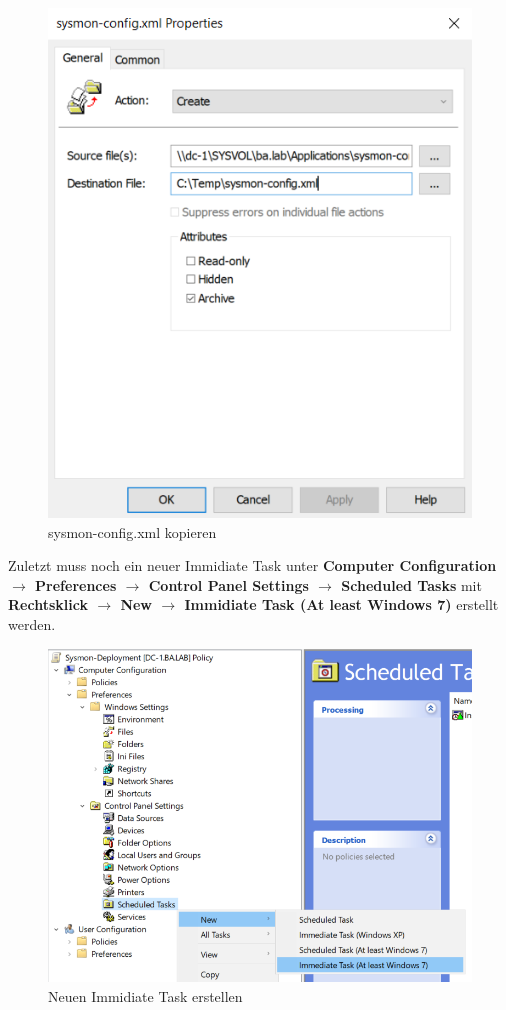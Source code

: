 \begin{minipage}{0.5\linewidth}
    \begin{figure}[H]
        \centering
        \includegraphics[width=0.7\linewidth]{../img/sysmon/config-file.png}
        \caption{sysmon-config.xml kopieren}
    \end{figure}
\end{minipage}

Zuletzt muss noch ein neuer Immidiate Task unter \textbf{Computer Configuration $\rightarrow$ Preferences $\rightarrow$ Control Panel Settings $\rightarrow$ Scheduled Tasks} mit \textbf{Rechtsklick $\rightarrow$ New $\rightarrow$ Immidiate Task (At least Windows 7)} erstellt werden.
\begin{figure}[H]
    \centering
    \includegraphics[width=0.7\linewidth]{../img/sysmon/new-scheduled-task.png}
    \caption{Neuen Immidiate Task erstellen}
\end{figure}

